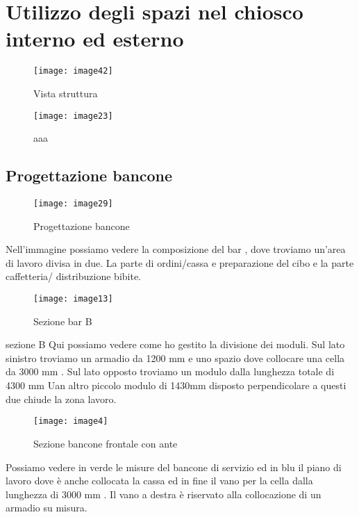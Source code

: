 \section{Utilizzo degli spazi nel chiosco interno ed esterno}

\begin{figure}[H]
	\centering
	\texttt{[image: image42]}
	\caption{Vista struttura}
	\label{fig:mesh1}
\end{figure}


\begin{figure}[H]
	\centering
	\texttt{[image: image23]}
	\caption{aaa}
	\label{fig:mesh1}
\end{figure}


\subsection{Progettazione bancone}


\begin{figure}[H]
	\centering
	\texttt{[image: image29]}
	\caption{Progettazione bancone}
	\label{fig:mesh1}
\end{figure}

Nell'immagine  possiamo vedere la composizione del bar  , dove troviamo un'area di lavoro divisa in due. La parte di ordini/cassa e preparazione del cibo  e la parte caffetteria/ distribuzione bibite.

\begin{figure}[H]
	\centering
	\texttt{[image: image13]}
	\caption{Sezione bar B}
	\label{fig:mesh1}
\end{figure}

sezione B
Qui possiamo vedere come ho gestito la divisione dei moduli.
Sul lato sinistro troviamo un armadio da 1200 mm e uno spazio dove collocare una cella da 3000 mm .
Sul lato opposto troviamo un modulo dalla lunghezza totale di 4300 mm 
Uan  altro piccolo modulo di 1430mm disposto perpendicolare a questi due chiude la zona lavoro. 

\begin{figure}[H]
	\centering
	\texttt{[image: image4]}
	\caption{Sezione bancone frontale con ante}
	\label{fig:mesh1}
\end{figure}


Possiamo vedere in verde le misure del bancone di servizio ed in blu il piano di lavoro dove è anche collocata la  cassa  ed in fine il vano per la cella dalla lunghezza di 3000 mm . 
Il vano a destra è riservato alla collocazione di un armadio su misura. 

